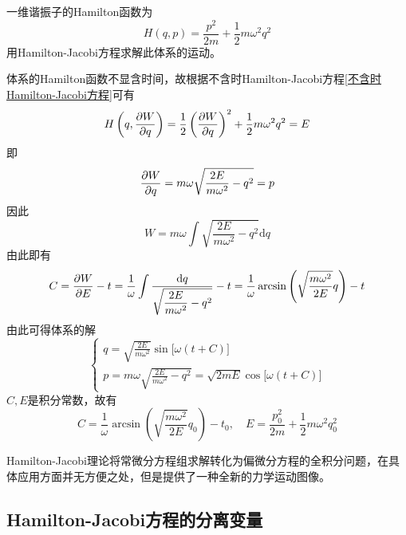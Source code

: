 \begin{example}
一维谐振子的Hamilton函数为
\begin{equation*}
	H(q,p) = \frac{p^2}{2m} + \frac12 m\omega^2 q^2
\end{equation*}
用Hamilton-Jacobi方程求解此体系的运动。
\end{example}
\begin{solution}
体系的Hamilton函数不显含时间，故根据不含时Hamilton-Jacobi方程\eqref{不含时Hamilton-Jacobi方程}可有
\begin{equation*}
	H\left(q,\frac{\partial W}{\partial q}\right) = \frac12 \left(\frac{\partial W}{\partial q}\right)^2 + \frac12 m\omega^2 q^2 = E
\end{equation*}
即
\begin{equation*}
	\frac{\partial W}{\partial q} = m\omega \sqrt{\frac{2E}{m\omega^2} - q^2} = p
\end{equation*}
因此
\begin{equation*}
	W = m\omega \int \sqrt{\frac{2E}{m\omega^2} - q^2} \mathrm{d} q
\end{equation*}
由此即有
\begin{equation*}
	C = \frac{\partial W}{\partial E} - t = \frac{1}{\omega} \int \frac{\mathrm{d} q}{\sqrt{\dfrac{2E}{m\omega^2}-q^2}} - t = \frac{1}{\omega} \arcsin\left(\sqrt{\frac{m\omega^2}{2E}}q\right) - t
\end{equation*}
由此可得体系的解
\begin{equation*}
\begin{cases}
	\displaystyle q = \sqrt{\frac{2E}{m\omega^2}} \sin \big[\omega(t+C)\big] \\[1.5ex]
	\displaystyle p = m\omega \sqrt{\frac{2E}{m\omega^2} - q^2} = \sqrt{2mE} \cos \big[\omega(t+C)\big]
\end{cases}
\end{equation*}
$C,E$是积分常数，故有
\begin{equation*}
	C = \frac{1}{\omega} \arcsin\left(\sqrt{\frac{m\omega^2}{2E}}q_0\right) - t_0,\quad E = \frac{p_0^2}{2m} + \frac12 m\omega^2 q_0^2
\end{equation*}
\end{solution}

Hamilton-Jacobi理论将常微分方程组求解转化为偏微分方程的全积分问题，在具体应用方面并无方便之处，但是提供了一种全新的力学运动图像。

\subsection{Hamilton-Jacobi方程的分离变量}

